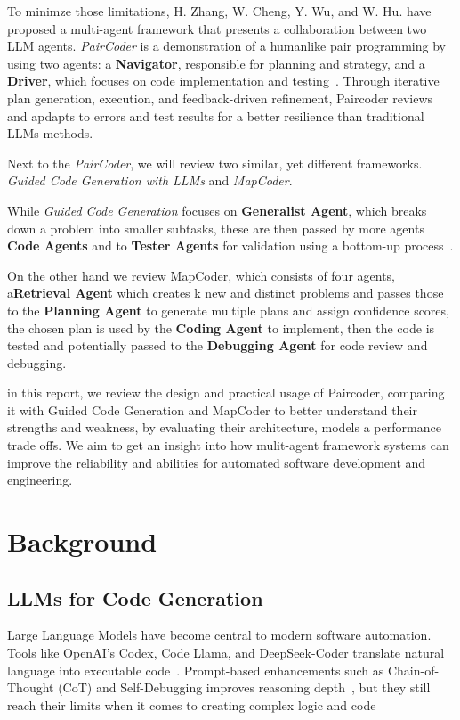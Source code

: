 \documentclass[11pt,a4paper]{article}
\begin{document}
To minimze those limitations, H. Zhang, W. Cheng, Y. Wu, and W. Hu. have proposed a multi-agent framework that presents a collaboration between two LLM agents. \textit{PairCoder} is a demonstration of a humanlike pair programming by using two agents: a \textbf{Navigator}, responsible for planning and strategy, and a  \textbf{Driver}, which focuses on code implementation and testing~\cite{zhang2024paircoder}. Through iterative plan generation, execution, and feedback-driven refinement, Paircoder reviews and apdapts to errors and test results for a better resilience than traditional LLMs methods.

Next to the \textit{PairCoder}, we will review two similar, yet different frameworks. \textit{Guided Code Generation with LLMs} and \textit{MapCoder}.

While \textit{Guided Code Generation} focuses on \textbf{Generalist Agent}, which breaks down a problem into smaller subtasks, these are then passed by more agents \textbf{Code Agents} and to \textbf{Tester Agents} for validation using a bottom-up process~\cite{almorsi2025guided}.

On the other hand we review MapCoder, which consists of four agents, a\textbf{Retrieval Agent} which creates k new and distinct problems and passes those to the \textbf{Planning Agent} to generate multiple plans and assign confidence scores, the chosen plan is used by the \textbf{Coding Agent} to implement, then the code is tested and potentially passed to the \textbf{Debugging Agent} for code review and debugging.

in this report, we review the design and practical usage of Paircoder, comparing it with Guided Code Generation and MapCoder to better understand their strengths and weakness, by evaluating their architecture, models a performance trade offs. We aim to get an insight into how mulit-agent framework systems can improve the reliability and abilities for automated software development and engineering. 

\section{Background}

\subsection{LLMs for Code Generation}
Large Language Models have become central to modern software automation. Tools like OpenAI’s Codex, Code Llama, and DeepSeek-Coder translate natural language into executable code~\cite{zhang2024paircoder}. Prompt-based enhancements such as Chain-of-Thought (CoT) and Self-Debugging improves reasoning depth~\cite{chen2024selfdebugging}, but they still reach their limits when it comes to creating complex logic and code
\end{document}
